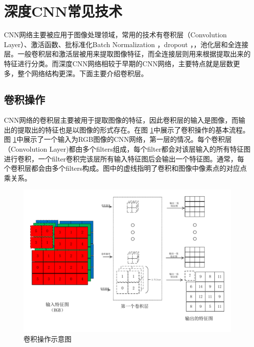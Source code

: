 \documentclass[ pdftex, oneside, master]{NJUthesis}
\begin{document}

\section{深度CNN常见技术}
CNN网络主要被应用于图像处理领域，常用的技术有卷积层（Convolution Layer）、激活函数、批标准化Batch Normalization \cite{batchnormalization}，dropout \cite{dropout1}，\cite{dropout2}，池化层\cite{networkinnetwork}和全连接层。一般卷积层和激活层被用来提取图像特征，而全连接层则用来根据提取出来的特征进行分类。而深度CNN网络相较于早期的CNN网络，主要特点就是层数更多，整个网络结构更深。下面主要介绍卷积层。

\subsection{卷积操作}
CNN网络的卷积层主要被用于提取图像的特征，因此卷积层的输入是图像，而输出的提取出的特征也是以图像的形式存在。在图 \ref{convolution}中展示了卷积操作的基本流程。图 \ref{convolution}中展示了一个输入为RGB图像的CNN网络，第一层的情况。每个卷积层（Convolution Layer)都由多个filters组成，每个filter都会对该层输入的所有特征图进行卷积，一个filter卷积完该层所有输入特征图后会输出一个特征图。通常，每个卷积层都会由多个filters构成。图中的虚线指明了卷积和图像中像素点的对应点乘关系。

\begin{figure}[h]
	\centering
	\includegraphics[width=0.7\linewidth]{convolution.pdf}  %
	\caption{卷积操作示意图}  %
	\label{convolution}   %
\end{figure}
\end{document}

